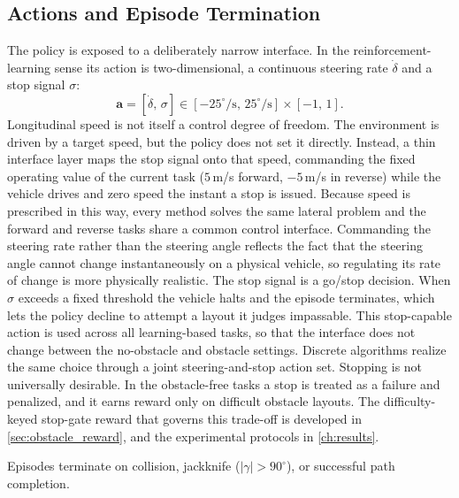 \subsection{Actions and Episode Termination}

The policy is exposed to a deliberately narrow interface. In the reinforcement-learning sense its action is two-dimensional, a continuous steering rate $\dot{\delta}$ and a stop signal $\sigma$:
\begin{equation}
    \mathbf{a} = [\dot{\delta},\, \sigma] \in [-25^\circ/\text{s},\, 25^\circ/\text{s}] \times [-1,\, 1].
    \label{eq:action_space}
\end{equation}
Longitudinal speed is not itself a control degree of freedom. The environment is driven by a target speed, but the policy does not set it directly. Instead, a thin interface layer maps the stop signal onto that speed, commanding the fixed operating value of the current task ($5$\,m/s forward, $-5$\,m/s in reverse) while the vehicle drives and zero speed the instant a stop is issued. Because speed is prescribed in this way, every method solves the same lateral problem and the forward and reverse tasks share a common control interface. Commanding the steering rate rather than the steering angle reflects the fact that the steering angle cannot change instantaneously on a physical vehicle, so regulating its rate of change is more physically realistic. The stop signal is a go/stop decision. When $\sigma$ exceeds a fixed threshold the vehicle halts and the episode terminates, which lets the policy decline to attempt a layout it judges impassable. This stop-capable action is used across all learning-based tasks, so that the interface does not change between the no-obstacle and obstacle settings. Discrete algorithms realize the same choice through a joint steering-and-stop action set. Stopping is not universally desirable. In the obstacle-free tasks a stop is treated as a failure and penalized, and it earns reward only on difficult obstacle layouts. The difficulty-keyed stop-gate reward that governs this trade-off is developed in \cref{sec:obstacle_reward}, and the experimental protocols in \cref{ch:results}.

Episodes terminate on collision, jackknife ($|\gamma| > 90^\circ$), or successful path completion.
